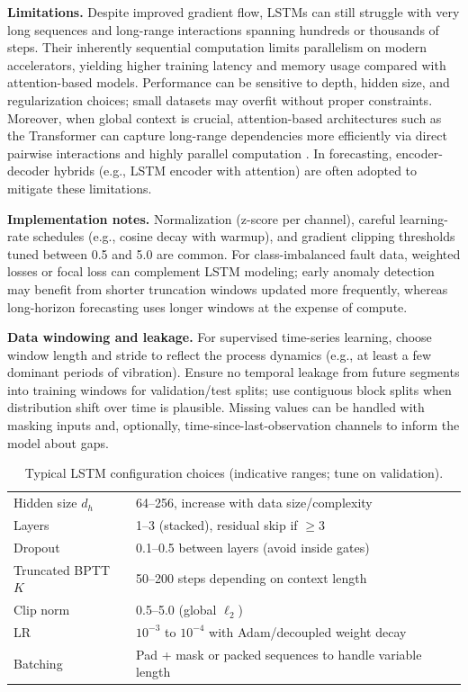 \textbf{Limitations.} Despite improved gradient flow, LSTMs can still struggle with very long sequences and long-range interactions spanning hundreds or thousands of steps. Their inherently sequential computation limits parallelism on modern accelerators, yielding higher training latency and memory usage compared with attention-based models. Performance can be sensitive to depth, hidden size, and regularization choices; small datasets may overfit without proper constraints. Moreover, when global context is crucial, attention-based architectures such as the Transformer can capture long-range dependencies more efficiently via direct pairwise interactions and highly parallel computation \cite{pascanu2013difficulty, vaswani2017attention}. In forecasting, encoder-decoder hybrids (e.g., LSTM encoder with attention) are often adopted to mitigate these limitations.

\textbf{Implementation notes.} Normalization (z-score per channel), careful learning-rate schedules (e.g., cosine decay with warmup), and gradient clipping thresholds tuned between 0.5 and 5.0 are common. For class-imbalanced fault data, weighted losses or focal loss can complement LSTM modeling; early anomaly detection may benefit from shorter truncation windows updated more frequently, whereas long-horizon forecasting uses longer windows at the expense of compute.

\textbf{Data windowing and leakage.} For supervised time-series learning, choose window length and stride to reflect the process dynamics (e.g., at least a few dominant periods of vibration). Ensure no temporal leakage from future segments into training windows for validation/test splits; use contiguous block splits when distribution shift over time is plausible. Missing values can be handled with masking inputs and, optionally, time-since-last-observation channels to inform the model about gaps.

\begin{table}[t]
\centering
\caption{Typical LSTM configuration choices (indicative ranges; tune on validation).}
\label{tab:lstm_config}
\begin{tabular}{l l}
\hline
Hidden size \(d_h\) & 64--256, increase with data size/complexity \\
Layers & 1--3 (stacked), residual skip if \(\geq 3\) \\
Dropout & 0.1--0.5 between layers (avoid inside gates) \\
Truncated BPTT \(K\) & 50--200 steps depending on context length \\
Clip norm & 0.5--5.0 (global \(\ell_2\)) \\
LR & \(10^{-3}\) to \(10^{-4}\) with Adam/decoupled weight decay \\
Batching & Pad + mask or packed sequences to handle variable length \\
\hline
\end{tabular}
\end{table}

